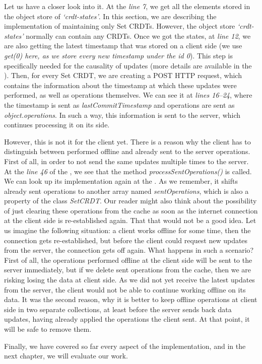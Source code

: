Let us have a closer look into it. At the \textit{line 7}, we get all the elements stored in the object store of \textit{`crdt-states'}. In this section, we are describing the implementation of maintaining only Set CRDTs. However, the object store \textit{`crdt-states'} normally can contain any CRDTs. Once we got the states, at \textit{line 12}, we are also getting the latest timestamp that was stored on a client side (we use \textit{get(0) here, as we store every new timestamp under the id \textit{0}}). This step is specifically needed for the causality of updates (more details are available in the ). Then, for every Set CRDT, we are creating a POST HTTP request, which contains the information about the timestamp at which these updates were performed, as well as operations themselves. We can see it at \textit{lines 16--24}, where the timestamp is sent as \textit{lastCommitTimestamp} and operations are sent as \textit{object.operations}. In such a way, this information is sent to the server, which continues processing it on its side.

However, this is not it for the client yet. There is a reason why the client has to distinguish between performed offline and already sent to the server operations. First of all, in order to not send the same updates multiple times to the server. At the \textit{line 46} of the , we see that the method \textit{processSentOperations()} is called. We can look up its implementation again at the . As we remember, it shifts already sent operations to another array named \textit{sentOperations}, which is also a property of the class \textit{SetCRDT}. Our reader might also think about the possibility of just clearing these operations from the cache as soon as the internet connection at the client side is re-established again. That that would not be a good idea. Let us imagine the following situation: a client works offline for some time, then the connection gets re-established, but before the client could request new updates from the server, the connection gets off again. What happens in such a scenario? First of all, the operations performed offline at the client side will be sent to the server immediately, but if we delete sent operations from the cache, then we are risking losing the data at client side. As we did not yet receive the latest updates from the server, the client would not be able to continue working offline on its data. It was the second reason, why it is better to keep offline operations at client side in two separate collections, at least before the server sends back data updates, having already applied the operations the client sent. At that point, it will be safe to remove them.

Finally, we have covered so far every aspect of the implementation, and in the next chapter, we will evaluate our work.